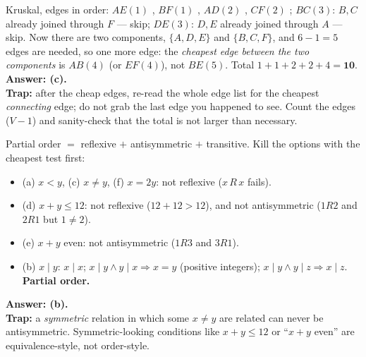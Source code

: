 \documentclass{fkt-notes}
\theoremstyle{definition}
\begin{document}
\begin{example}\leavevmode
  \begin{center}
  \end{center}
  Kruskal, edges in order: $AE(1)$ \checkmark, $BF(1)$ \checkmark,
  $AD(2)$ \checkmark, $CF(2)$ \checkmark; $BC(3)$: $B,C$ already joined
  through $F$ --- skip; $DE(3)$: $D,E$ already joined through $A$ ---
  skip. Now there are two components, $\{A,D,E\}$ and $\{B,C,F\}$, and
  $6-1=5$ edges are needed, so one more edge: the \emph{cheapest edge
  between the two components} is $AB(4)$ (or $EF(4)$), not $BE(5)$.
  Total $1+1+2+2+4=\mathbf{10}$. \textbf{Answer: (c).}\\
  \textbf{Trap:} after the cheap edges, re-read the whole edge list for
  the cheapest \emph{connecting} edge; do not grab the last edge you
  happened to see. Count the edges ($V-1$) and sanity-check that the
  total is not larger than necessary.
\end{example}

\begin{example}
  Partial order $=$ reflexive $+$ antisymmetric $+$ transitive. Kill the
  options with the cheapest test first:
  \begin{itemize}[nosep]
    \item (a) $x<y$, (c) $x\neq y$, (f) $x=2y$: not reflexive ($x\,R\,x$ fails).
    \item (d) $x+y\le12$: not reflexive ($12+12>12$), and not antisymmetric ($1R2$ and $2R1$ but $1\neq2$).
    \item (e) $x+y$ even: not antisymmetric ($1R3$ and $3R1$).
    \item (b) $x\mid y$: $x\mid x$; $x\mid y\wedge y\mid x\Rightarrow x=y$ (positive integers); $x\mid y\wedge y\mid z\Rightarrow x\mid z$. \textbf{Partial order.}
  \end{itemize}
  \textbf{Answer: (b).}\\
  \textbf{Trap:} a \emph{symmetric} relation in which some $x\neq y$ are
  related can never be antisymmetric. Symmetric-looking conditions like
  $x+y\le12$ or ``$x+y$ even'' are equivalence-style, not order-style.
\end{example}
\end{document}
